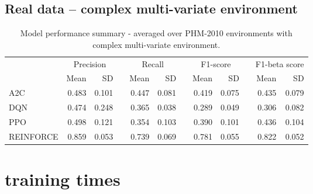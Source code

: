\documentclass[a4paper, 12pt]{article}
\newcommand{\rowspace}[1]{\renewcommand{\arraystretch}{#1}}
\begin{document}
\subsection{Real data -- complex multi-variate environment}
\begin{table}[hbt!]\centering
	\sffamily
	\rowspace{1.3}
	\begin{tabular}{@{}l rr c rr c rr c rr@{}}
		\arrayrulecolor{black!40}\toprule
		& \multicolumn{2}{c}{Precision} & \phantom{i} & \multicolumn{2}{c}{Recall} & \phantom{i} & \multicolumn{2}{c}{F1-score} & \phantom{i} & \multicolumn{2}{c}{F1-beta score} \\
		\cmidrule{2-3} \cmidrule{5-6} \cmidrule{8-9} \cmidrule{11-12} 
		
		&Mean &SD & &Mean &SD & &Mean &SD& &Mean & SD\\ \midrule
		A2C & 0.483 & 0.101 & &0.447 & 0.081 & & 0.419 & 0.075 & &0.435 &0.079 \\
		DQN & 0.474 & 0.248 & &0.365 & 0.038 & & 0.289 & 0.049 & &0.306 &0.082 \\
		PPO & 0.498 & 0.121 & &0.354 & 0.103 & & 0.390 & 0.101 & &0.436 &0.104 \\
		REINFORCE & 0.859 & 0.053 & &0.739 & 0.069 & & 0.781 & 0.055 & &0.822 &0.052 \\
		\bottomrule
	\end{tabular}
	\caption{Model performance summary - averaged over PHM-2010 environments with complex multi-variate environment.}
	\label{tbl:PHMMS}
\end{table}

\section{training times}
\end{document}

